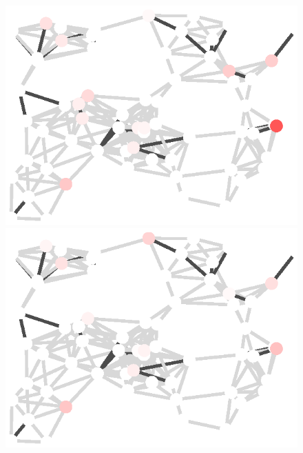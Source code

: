 \begin{figure}[t]
\begin{center}
\begin{minipage}{0.95\textwidth}
\begin{minipage}[t]{0.17\textwidth}
            \end{minipage}\hspace{0.3em}
            \begin{minipage}[t]{0.17\textwidth}
                \centering
                \includegraphics[width=\linewidth]{figures/residual_plot/gtv}
            \end{minipage}\hspace{0.3em}
            \begin{minipage}[t]{0.17\textwidth}
                \centering
                \includegraphics[width=\linewidth]{figures/residual_plot/proposed_1}

\end{minipage}
\end{minipage}
\end{center}
\end{figure}
